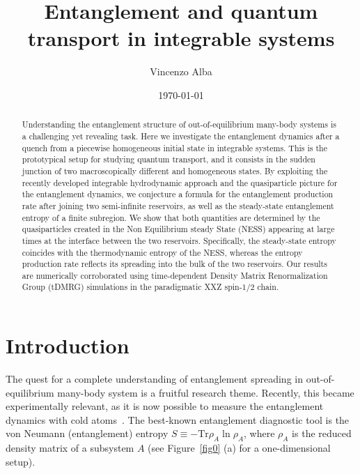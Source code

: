 \documentclass[twocolumn,superscriptaddress,prb,10pt]{revtex4-1}
\begin{document}
\title{Entanglement and quantum transport in integrable systems} 


\author{Vincenzo Alba}

\date{\today}




\begin{abstract} 
Understanding the entanglement structure of out-of-equilibrium many-body 
systems is a challenging yet revealing task. Here we investigate the entanglement dynamics 
after a quench from a piecewise homogeneous initial state in integrable systems. This is the 
prototypical setup for studying quantum transport, and it consists in the 
sudden junction of two macroscopically different and homogeneous states. By exploiting the 
recently developed integrable hydrodynamic approach and the quasiparticle 
picture for the entanglement dynamics, we conjecture a formula for the 
entanglement production rate after joining two semi-infinite reservoirs, 
as well as the steady-state entanglement entropy of a finite subregion. 
We show that both quantities are determined by the quasiparticles created 
in the Non Equilibrium steady State (NESS) appearing at large times at the 
interface between the two reservoirs. Specifically, the steady-state entropy coincides 
with the thermodynamic entropy of the NESS, whereas the entropy production rate  
reflects its spreading into the bulk of the two reservoirs. 
Our results are numerically corroborated using time-dependent Density Matrix Renormalization 
Group (tDMRG) simulations in the paradigmatic XXZ spin-$1/2$ chain. 





\end{abstract}


\maketitle


\section{Introduction}

The quest for a complete understanding of entanglement spreading 
in out-of-equilibrium many-body system is a fruitful research theme. 
Recently, this became experimentally relevant, as 
it is now possible to measure the entanglement dynamics with 
cold atoms~\cite{islam-2015,kaufman-2016}. 
The best-known entanglement diagnostic tool is the von Neumann (entanglement) 
entropy $S\equiv-\textrm{Tr}\rho_A\ln\rho_A$, where $\rho_A$ is the 
reduced density matrix of a subsystem $A$ (see Figure~\ref{fig0} (a) for a 
one-dimensional setup). 
\end{document}
